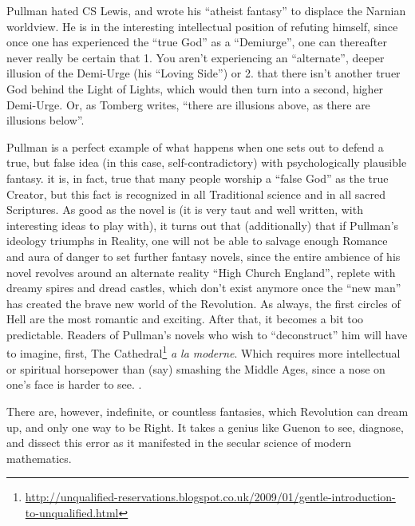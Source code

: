 Pullman hated CS Lewis, and wrote his ``atheist fantasy'' to displace the Narnian worldview. He is in the interesting intellectual position of refuting himself, since once one has experienced the ``true God'' as a ``Demiurge'', one can thereafter never really be certain that 1. You aren't experiencing an ``alternate'', deeper illusion of the Demi-Urge (his ``Loving Side'') or 2. that there isn't another truer God behind the Light of Lights, which would then turn into a second, higher Demi-Urge. Or, as Tomberg writes, ``there are illusions above, as there are illusions below''.

Pullman is a perfect example of what happens when one sets out to defend a true, but false idea (in this case, self-contradictory) with psychologically plausible fantasy. it is, in fact, true that many people worship a ``false God'' as the true Creator, but this fact is recognized in all Traditional science and in all sacred Scriptures. As good as the novel is (it is very taut and well written, with interesting ideas to play with), it turns out that (additionally) that if Pullman's ideology triumphs in Reality, one will not be able to salvage enough Romance and aura of danger to set further fantasy novels, since the entire ambience of his novel revolves around an alternate reality ``High Church England'', replete with dreamy spires and dread castles, which don't exist anymore once the ``new man'' has created the brave new world of the Revolution. As always, the first circles of Hell are the most romantic and exciting. After that, it becomes a bit too predictable. Readers of Pullman's novels who wish to ``deconstruct'' him will have to imagine, first, The Cathedral\footnote{\url{http://unqualified-reservations.blogspot.co.uk/2009/01/gentle-introduction-to-unqualified.html}} \emph{a la moderne}. Which requires more intellectual or spiritual horsepower than (say) smashing the Middle Ages, since a nose on one's face is harder to see. .

There are, however, indefinite, or countless fantasies, which Revolution can dream up, and only one way to be Right. It takes a genius like Guenon to see, diagnose, and dissect this error as it manifested in the secular science of modern mathematics.



